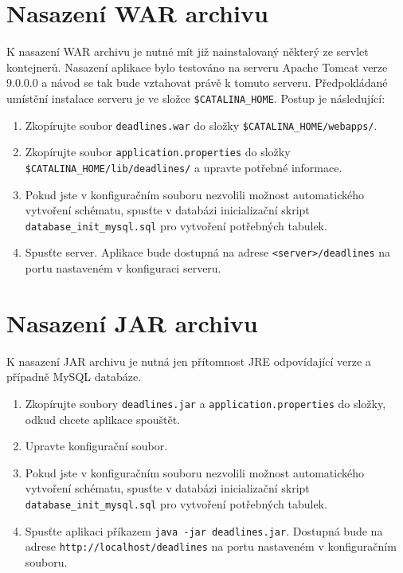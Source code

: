 \documentclass[thesis=B,czech]{FITthesis}[2012/06/26]
\begin{document}
	\section{Nasazení WAR archivu}
		K nasazení WAR archivu je nutné mít již nainstalovaný některý ze servlet kontejnerů. Nasazení aplikace bylo testováno na serveru Apache Tomcat verze 9.0.0.0 a návod se tak bude vztahovat právě k tomuto serveru. Předpokládané umístění instalace serveru je ve složce \texttt{\$CATALINA\_HOME}. Postup je následující:
		\begin{enumerate}
			\item Zkopírujte soubor \texttt{deadlines.war} do složky \texttt{\$CATALINA\_HOME/\allowbreak webapps/}.
			\item Zkopírujte soubor \texttt{application.properties} do složky \texttt{\$CATALINA\_HOME/\allowbreak lib/\allowbreak deadlines/} a upravte potřebné informace.
			\item Pokud jste v konfiguračním souboru nezvolili možnost automatického vytvoření schématu, spusťte v databázi inicializační skript \texttt{database\allowbreak \_init\allowbreak \_mysql.sql} pro vytvoření potřebných tabulek.
			\item Spusťte server. Aplikace bude dostupná na adrese \texttt{<server>/deadlines} na portu nastaveném v konfiguraci serveru.
		\end{enumerate}
	
	\section{Nasazení JAR archivu}
		K nasazení JAR archivu je nutná jen přítomnost JRE odpovídající verze a případně MySQL databáze.
		\begin{enumerate}
			\item Zkopírujte soubory \texttt{deadlines.jar} a \texttt{application.properties} do složky, odkud chcete aplikace spouštět.
			\item Upravte konfigurační soubor.
			\item Pokud jste v konfiguračním souboru nezvolili možnost automatického vytvoření schématu, spusťte v databázi inicializační skript \texttt{database\allowbreak \_init\allowbreak \_mysql.sql} pro vytvoření potřebných tabulek.
			\item Spusťte aplikaci příkazem \texttt{java -jar deadlines.jar}. Dostupná bude na adrese \texttt{http://localhost/deadlines} na portu nastaveném v konfiguračním souboru.
		\end{enumerate}
		
\end{document}
